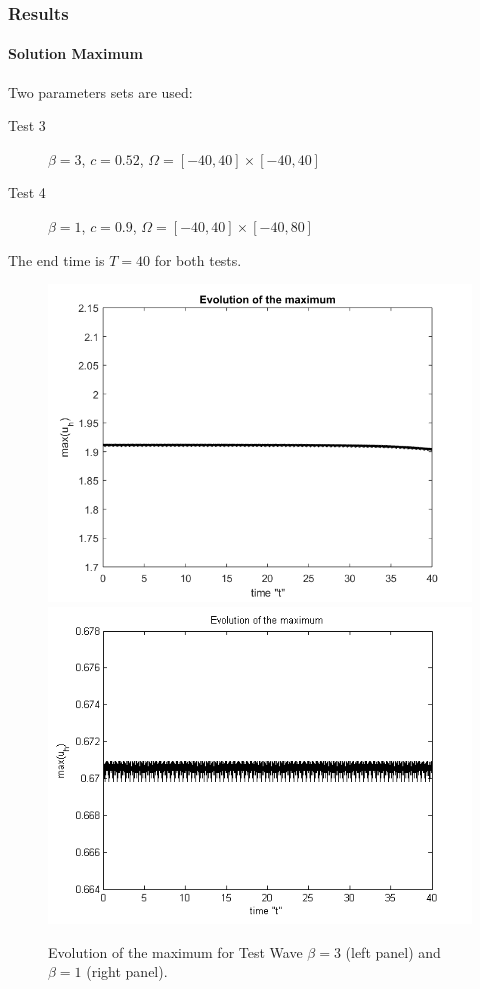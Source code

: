 \documentclass{beamer}
\begin{document}
\begin{frame}
\frametitle{Results}
\framesubtitle{Solution Maximum}

Two parameters sets are used:
\begin{description}
 \item[Test 3] $\beta = 3$, $c = 0.52$, $\Omega = [-40, 40] \times [-40, 40]$
 \item[Test 4] $\beta = 1$, $c = 0.9$, $\Omega = [-40, 40] \times [-40, 80]$
\end{description}
The end time is $T=40$ for both tests.
\begin{figure}[ht]
	\centering
	\begin{minipage}[b]{0.4\linewidth}
		\includegraphics[width=\linewidth]{figures/EvolutionOfMaximum_bt3_t40.png}
	\end{minipage}	
	\begin{minipage}[b]{0.4\linewidth}
		 \includegraphics[width=\linewidth]{figures/EvolutionOfMaximum_bt1_t40.png}
	\end{minipage}

Evolution of the maximum for Test Wave $\beta =3$ (left panel) and $\beta=1$ (right panel).
\end{figure}

\end{frame}
\end{document}
